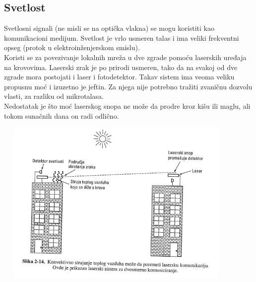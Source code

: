 \documentclass{article} %
\begin{document}
\subsection{Svetlost}
Svetlosni signali (ne misli se na optička vlakna) se mogu koristiti kao komunikacioni medijum. Svetlost je vrlo usmeren talas i ima veliki frekventni opseg (protok u elektroinženjerskom smislu).\\
Koristi se za povezivanje lokalnih mreža u dve zgrade pomoću laserskih uređaja na krovovima. Laserski zrak je po prirodi usmeren, tako da na svakoj od dve zgrade mora postojati i laser i fotodetektor. Takav sistem ima veoma veliku propusnu moć i izuzetno je jeftin. Za njega nije potrebno tražiti zvaničnu dozvolu vlasti, za razliku od mikrotalasa. \\
Nedostatak je što moć laserskog snopa ne može da prodre kroz kišu ili maglu, ali tokom sunačnih dana on radi odlično.
\begin{center}
\includegraphics[width=12cm, height=8cm]{svetlost}\\
\end{center}
\end{document}
